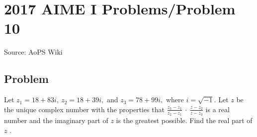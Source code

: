 \documentclass[12pt]{article}
\begin{document}
\section*{{2017 AIME I Problems/Problem 10}}
Source: AoPS Wiki

\subsection*{Problem}
Let $z_1=18+83i,~z_2=18+39i,$ and $z_3=78+99i,$ where $i=\sqrt{-1}.$ Let $z$ be the unique complex number with the properties that $\frac{z_3-z_1}{z_2-z_1}~\cdot~\frac{z-z_2}{z-z_3}$ is a real number and the imaginary part of $z$ is the greatest possible. Find the real part of $z$ .
\end{document}
